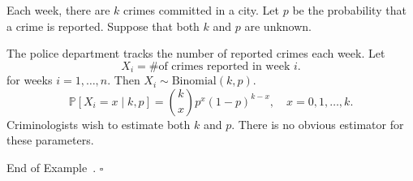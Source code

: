 \documentclass[10pt]{article}
\theoremstyle{definition}
\newtheorem{example}[theorem]{Example}
\renewenvironment{example}
{\begin{oldexample}}
  {\par\smallskip\hfill   End of Example~\theexample. $\square$    \par\end{oldexample}}
\newcommand{\1}[1]{\textbf{1}_{\left[#1\right]}} %
\def\P{\mathbb{P}} %
\begin{document}
\begin{example}[Crimes]
  Each week, there are $k$ crimes committed in a city. Let $p$ be the
  probability that a crime is reported. Suppose that both $k$ and $p$ are
  unknown.

  The police department tracks the number of reported crimes each week. Let
  \begin{equation*}
    X_{i} = \text{\# of crimes reported in week }i.
  \end{equation*}
  for weeks $i=1,\ldots,n$. Then $X_{i}\sim \text{Binomial}(k,p)$.
  \begin{equation*}
    \P\left[X_{i}=x \mid k,p \right] = {k\choose x}p^{x}(1-p)^{k-x}, \quad x=0,1,\ldots,k.
  \end{equation*}
  Criminologists wish to estimate both $k$ and $p$. There is no obvious
  estimator for these parameters.


\end{example}
\end{document}
